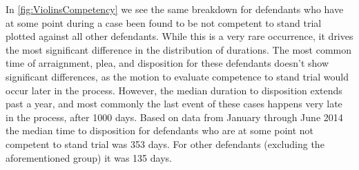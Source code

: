 In \autoref{fig:ViolinsCompetency} we see the same breakdown for
defendants who have at some point during a case been found to be not
competent to stand trial plotted against all other defendants. While
this is a very rare occurrence,
it drives the most significant difference in the distribution of
durations. The most common time of arraignment, plea, and disposition
for these defendants doesn't show significant differences, as the
motion to evaluate competence to stand trial would occur later in the
process.  However, the median duration to disposition extends past a
year, and most commonly the last event of these cases happens very
late in the process, after 1000 days. Based on data from January
through June 2014 the median time to disposition for defendants who
are at some point not competent to stand trial was 353 days. For other
defendants (excluding the aforementioned group) it was 135 days.

